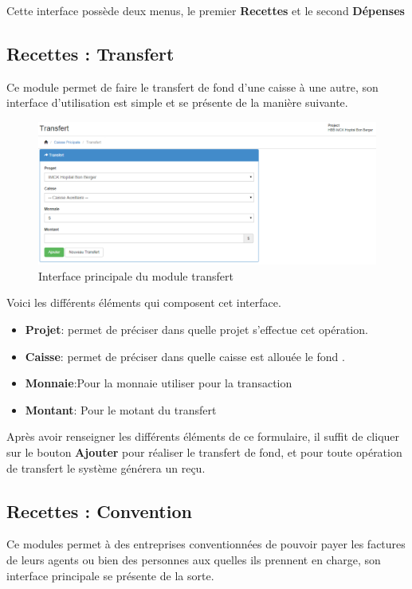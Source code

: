 \documentclass[12pt,a4paper]{report}
\begin{document}
Cette interface possède deux menus, le premier \textbf{Recettes} et le second \textbf{Dépenses}

\subsection{Recettes : Transfert}
Ce module permet de faire le transfert de fond d'une caisse à une autre, son interface d'utilisation est simple et se présente de la manière suivante.

\begin{figure}[h]
\begin{center}
\includegraphics[width=14cm]{pic/Transfert.png}
\end{center}
\caption{Interface principale du module transfert}
\label{Interface principale du module transfert}
\end{figure}

Voici les différents éléments qui composent cet interface.

\begin{itemize}
\item \textbf{Projet}: permet de préciser dans quelle projet s'effectue cet opération. \\
\item \textbf{Caisse}: permet de préciser dans quelle caisse est allouée le fond .\\
\item \textbf{Monnaie}:Pour la monnaie utiliser pour la transaction \\
\item \textbf{Montant}: Pour le motant du transfert\\
\end{itemize}
Après avoir renseigner les différents éléments de ce formulaire, il suffit de cliquer sur le bouton \textbf{Ajouter} pour réaliser le transfert de fond, et pour toute opération de transfert le système générera un reçu.

\newpage
\subsection{Recettes : Convention}
Ce modules permet à des entreprises conventionnées de pouvoir payer les factures de leurs agents ou bien des personnes aux quelles ils prennent en charge, son interface principale se présente de la sorte.
\end{document}
